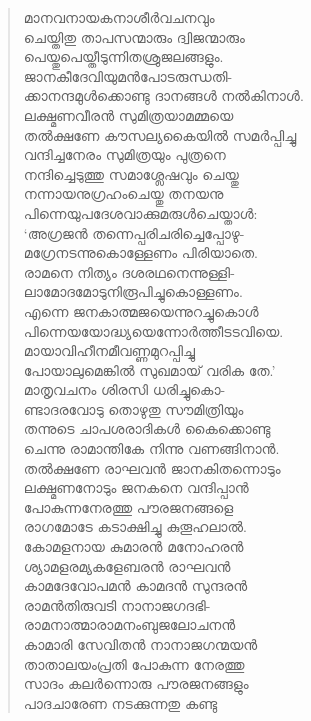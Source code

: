 \begin{verse}
മാനവനായകനാശീര്‍വചനവും\\
ചെയ്തിതു താപസന്മാരും ദ്വിജന്മാരും\\
പെയ്തുപെയ്തീടുന്നിതശ്രുജലങ്ങളും.\\
ജാനകീദേവിയുമന്‍പോടരുന്ധതി-\\
ക്കാനന്ദമുള്‍ക്കൊണ്ടു ദാനങ്ങള്‍ നല്‍കിനാള്‍.\\
ലക്ഷ്മണവീരന്‍ സുമിത്രയാമമ്മയെ\\
തല്‍ക്ഷണേ കൗസല്യകൈയില്‍ സമര്‍പ്പിച്ചു\\
വന്ദിച്ചനേരം സുമിത്രയും പുത്രനെ\\
നന്ദിച്ചെടുത്തു സമാശ്ലേഷവും ചെയ്തു\\
നന്നായനുഗ്രഹംചെയ്തു തനയനു\\
പിന്നെയുപദേശവാക്കുമരുള്‍ചെയ്താള്‍:\\
‘അഗ്രജന്‍ തന്നെപ്പരിചരിച്ചെപ്പോഴു-\\
മഗ്രേനടന്നുകൊള്ളേണം പിരിയാതെ.\\
രാമനെ നിത്യം ദശരഥനെന്നുള്ളി-\\
ലാമോദമോടുനിരൂപിച്ചുകൊള്ളണം.\\
എന്നെ ജനകാത്മജയെന്നുറച്ചുകൊള്‍\\
പിന്നെയയോദ്ധ്യയെന്നോര്‍ത്തീടടവിയെ.\\
മായാവിഹീനമീവണ്ണമുറപ്പിച്ചു\\
പോയാലുമെങ്കില്‍ സുഖമായ് വരിക തേ.’\\
മാതൃവചനം ശിരസി ധരിച്ചുകൊ-\\
ണ്ടാദരവോടു തൊഴുതു സൗമിത്രിയും\\
തന്നുടെ ചാപശരാദികള്‍ കൈക്കൊണ്ടു\\
ചെന്നു രാമാന്തികേ നിന്നു വണങ്ങിനാന്‍.\\
തല്‍ക്ഷണേ രാഘവന്‍ ജാനകിതന്നൊടും\\
ലക്ഷ്മണനോടും ജനകനെ വന്ദിപ്പാന്‍\\
പോകുന്നനേരത്തു പൗരജനങ്ങളെ\\
രാഗമോടേ കടാക്ഷിച്ചു കുതൂഹലാല്‍.\\
കോമളനായ കുമാരന്‍ മനോഹരന്‍\\
ശ്യാമളരമ്യകളേബരന്‍ രാഘവന്‍\\
കാമദേവോപമന്‍ കാമദന്‍ സുന്ദരന്‍\\
രാമന്‍തിരുവടി നാനാജഗദഭി-\\
രാമനാത്മാരാമനംബുജലോചനന്‍\\
കാമാരി സേവിതന്‍ നാനാജഗന്മയന്‍\\
താതാലയംപ്രതി പോകുന്ന നേരത്തു\\
സാദം കലര്‍ന്നൊരു പൗരജനങ്ങളും\\
പാദചാരേണ നടക്കുന്നതു കണ്ടു\\

\end{verse}
